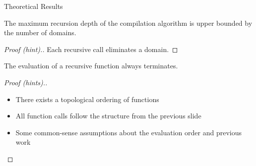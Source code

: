 \documentclass{beamer}
\begin{document}
\begin{frame}{Theoretical Results}
  \begin{theorem}
    The maximum \alert{recursion depth} of the compilation algorithm is upper
    bounded by the \alert{number of domains}.
  \end{theorem}
  \pause
  \begin{proof}[Proof (hint).]
    Each recursive call eliminates a domain.
  \end{proof}
  \pause
  \begin{theorem}
    The \alert{evaluation} of a recursive function always \alert{terminates}.
  \end{theorem}
  \pause
  \begin{proof}[Proof (hints).]
    \begin{itemize}
      \item There exists a \alert{topological ordering} of functions
      \item All function calls follow the \alert{structure} from the previous
            slide
      \item Some common-sense assumptions about the \alert{evaluation order} and
            previous work
    \end{itemize}
  \end{proof}
\end{frame}
\end{document}
